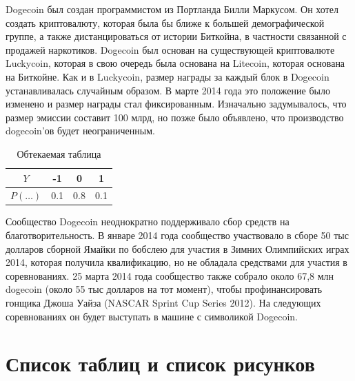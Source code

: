 \documentclass[12pt, a4paper]{article}
\begin{document}
Dogecoin был создан программистом из Портланда Билли Маркусом. Он хотел создать криптовалюту, которая была бы ближе к большей демографической группе, а также дистанцироваться от истории Биткойна, в частности связанной с продажей наркотиков. Dogecoin был основан на существующей криптовалюте Luckycoin, которая в свою очередь была основана на Litecoin, которая основана на Биткойне. Как и в Luckycoin, размер награды за каждый блок в Dogecoin устанавливалась случайным образом. В марте 2014 года это положение было изменено и размер награды стал фиксированным. Изначально задумывалось, что размер эмиссии составит 100 млрд, но позже было объявлено, что производство dogecoin'ов будет неограниченным.

\begin{table}
\begin{center}
\begin{tabular}{cccc}
\toprule
$Y$ & -1 & 0 & 1  \\
\midrule
$P(\ldots)$ & 0.1 & 0.8 & 0.1 \\
\bottomrule
\end{tabular}
\caption{Обтекаемая таблица}
\end{center}
\end{table}

Сообщество Dogecoin неоднократно поддерживало сбор средств на благотворительность. В январе 2014 года сообщество участвовало в сборе 50 тыс долларов сборной Ямайки по бобслею для участия в Зимних Олимпийских играх 2014, которая получила квалификацию, но не обладала средствами для участия в соревнованиях. 25 марта 2014 года сообщество также собрало около 67,8 млн dogecoin (около 55 тыс долларов на тот момент), чтобы профинансировать гонщика Джоша Уайза (NASCAR Sprint Cup Series 2012). На следующих соревнованиях он будет выступать в машине с символикой Dogecoin.


\section{Список таблиц и список рисунков}
\listoffigures

\listoftables
\end{document}
